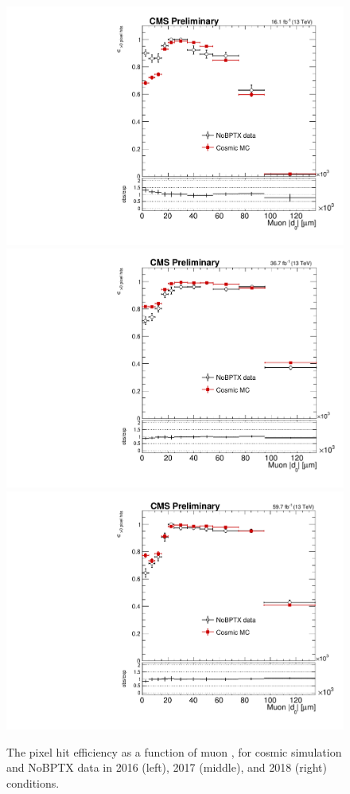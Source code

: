 \begin{figure}[hbtp]
\centering
\includegraphics[scale=0.35]{figures/systematics/muon_pixel_hit_eff/muonAbsD0_100000um_variableBins_coarse_2016.pdf}
\includegraphics[scale=0.35]{figures/systematics/muon_pixel_hit_eff/muonAbsD0_100000um_variableBins_coarse_2017.pdf}
\includegraphics[scale=0.35]{figures/systematics/muon_pixel_hit_eff/muonAbsD0_100000um_variableBins_coarse_2018.pdf}
\caption{The pixel hit efficiency as a function of muon \ad, for cosmic simulation and NoBPTX data in 2016 (left), 2017 (middle), and 2018 (right) conditions.}
\label{fig:muon_pixel_hit_eff}
\end{figure}
